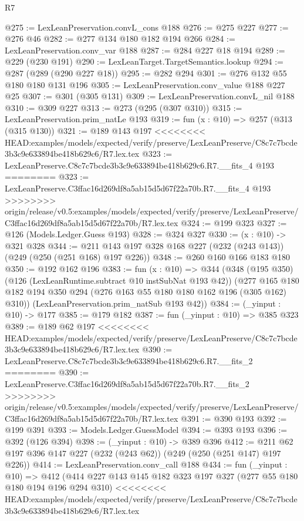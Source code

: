 \begin{lexlean}{R7}
\begin{coremodule}
{{{{{{{{{{{{{@275 := LexLeanPreservation.convL_cons @188
@276 := @275 @227
@277 := @276 @46
@282 := @277 @134 @180 @182 @194 @266
@284 := LexLeanPreservation.conv_var @188
@287 := @284 @227 @18 @194
@289 := @229 (@230 @191)
@290 := LexLeanTarget.TargetSemantics.lookup
@294 := @287 (@289 (@290 @227 @18))
@295 := @282 @294
@301 := @276 @132 @55 @180 @180 @131 @196
@305 := LexLeanPreservation.conv_value @188 @227 @25
@307 := @301 (@305 @131)
@309 := LexLeanPreservation.convL_nil @188
@310 := @309 @227
@313 := @273 (@295 (@307 @310))
@315 := LexLeanPreservation.prim_natLe @193
@319 := fun (x : @10) => @257 (@313 (@315 @130))
@321 := @189 @143 @197
<<<<<<<< HEAD:examples/models/expected/verify/preserve/LexLeanPreserve/C8c7c7bcde3b3c9e633894be418b629c6/R7.lex.tex
@323 := LexLeanPreserve.C8c7c7bcde3b3c9e633894be418b629c6.R7.__fits_4 @193
========
@323 := LexLeanPreserve.C3ffac16d269df8a5ab15d5d67f22a70b.R7.__fits_4 @193
>>>>>>>> origin/release/v0.5:examples/models/expected/verify/preserve/LexLeanPreserve/C3ffac16d269df8a5ab15d5d67f22a70b/R7.lex.tex
@324 := @199 @323
@327 := @126 (Models.Ledger.Guess @193)
@328 := @324 @327
@330 := (x : @10) -> @321 @328
@344 := @211 @143 @197 @328 @168 @227 (@232 (@243 @143)) (@249 (@250 (@251 @168) @197 @226))
@348 := @260 @160 @166 @183 @180
@350 := @192 @162 @196
@383 := fun (x : @10) =>
  @344
    (@348
      (@195 @350)
      (@126 (LexLeanRuntime.subtract @10 instSubNat @193 @42))
      (@277 @165 @180 @182 @194 @350 @294 (@276 @163 @55 @180 @180 @162 @196 (@305 @162) @310))
      (LexLeanPreservation.prim_natSub @193 @42))
@384 := (_yinput : @10) -> @177
@385 := @179 @182
@387 := fun (_yinput : @10) => @385 @323
@389 := @189 @62 @197
<<<<<<<< HEAD:examples/models/expected/verify/preserve/LexLeanPreserve/C8c7c7bcde3b3c9e633894be418b629c6/R7.lex.tex
@390 := LexLeanPreserve.C8c7c7bcde3b3c9e633894be418b629c6.R7.__fits_2
========
@390 := LexLeanPreserve.C3ffac16d269df8a5ab15d5d67f22a70b.R7.__fits_2
>>>>>>>> origin/release/v0.5:examples/models/expected/verify/preserve/LexLeanPreserve/C3ffac16d269df8a5ab15d5d67f22a70b/R7.lex.tex
@391 := @390 @193
@392 := @199 @391
@393 := Models.Ledger.GuessModel
@394 := @393 @193
@396 := @392 (@126 @394)
@398 := (_yinput : @10) -> @389 @396
@412 := @211 @62 @197 @396 @147 @227 (@232 (@243 @62)) (@249 (@250 (@251 @147) @197 @226))
@414 := LexLeanPreservation.conv_call @188
@434 := fun (_yinput : @10) =>
  @412
    (@414
      @227
      @143
      @145
      @182
      @323
      @197
      @327
      (@277 @55 @180 @180 @194 @196 @294 @310)
<<<<<<<< HEAD:examples/models/expected/verify/preserve/LexLeanPreserve/C8c7c7bcde3b3c9e633894be418b629c6/R7.lex.tex
}}}}}}}}}}}}}
\end{coremodule}
\end{lexlean}
